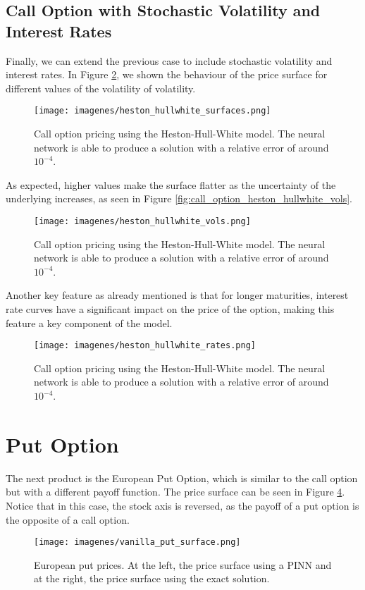 \documentclass[12pt]{report} %
\theoremstyle{plain}           %
\theoremstyle{definition}      %
\theoremstyle{remark}          %
\begin{document}
\subsection{Call Option with Stochastic Volatility and Interest Rates}

Finally, we can extend the previous case to include stochastic volatility and interest rates. In 
Figure \ref{fig:call_option_heston_hullwhite}, we shown the behaviour of the price surface for different values of the
volatility of volatility. 

\begin{figure}[H]
	\centering
	\texttt{[image: imagenes/heston\_hullwhite\_surfaces.png]}
	\caption{Call option pricing using the Heston-Hull-White model. The neural network is able to produce a solution with a relative error of around $10^{-4}$.}
	\label{fig:call_option_heston_hullwhite_surface}
\end{figure}

As expected, higher values make the surface flatter as the 
uncertainty of the underlying increases, as seen in Figure \ref{fig:call_option_heston_hullwhite_vols}. 

\begin{figure}[H]
	\centering
	\texttt{[image: imagenes/heston\_hullwhite\_vols.png]}
	\caption{Call option pricing using the Heston-Hull-White model. The neural network is able to produce a solution with a relative error of around $10^{-4}$.}
	\label{fig:call_option_heston_hullwhite}
\end{figure}

Another key feature as already mentioned is that for longer maturities, interest rate curves have a significant impact on the
price of the option, making this feature a key component of the model. 

\begin{figure}[H]
	\centering
	\texttt{[image: imagenes/heston\_hullwhite\_rates.png]}
	\caption{Call option pricing using the Heston-Hull-White model. The neural network is able to produce a solution with a relative error of around $10^{-4}$.}
	\label{fig:call_option_heston_hullwhite_interest_rates}
\end{figure}

\section{Put Option}
The next product is the European Put Option, which is similar to the call option but with a different payoff function. 
The price surface can be seen in Figure \ref{fig:put_option}. Notice that in this case, the stock axis is reversed, as the payoff of a put option is the opposite of a call option.
\begin{figure}[H]
	\centering
	\texttt{[image: imagenes/vanilla\_put\_surface.png]}
	\caption{European put prices. At the left, the price surface using a PINN and at the right, the price surface using the exact solution.}
	\label{fig:put_option}
\end{figure}
\end{document}
